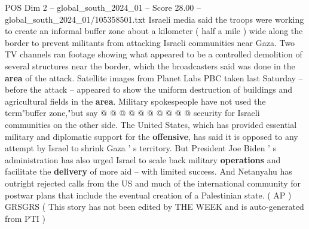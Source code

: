 \begin{textsample}{POS Dim 2 – global\_south\_2024\_01 – Score 28.00 – global\_south\_2024\_01/105358501.txt}
Israeli media said the troops were working to create an informal buffer zone about a kilometer ( half a mile ) wide along the border to prevent militants from attacking Israeli communities near Gaza.
Two TV channels ran footage showing what appeared to be a controlled demolition of several structures near the border, which the broadcasters said was done in the \textbf{area} of the attack.
Satellite images from Planet Labs PBC taken last Saturday -- before the attack -- appeared to show the uniform destruction of buildings and agricultural fields in the \textbf{area}.
Military spokespeople have not used the term"buffer zone,"but say @ @ @ @ @ @ @ @ @ @ security for Israeli communities on the other side.
The United States, which has provided essential military and diplomatic support for the \textbf{offensive}, has said it is opposed to any attempt by Israel to shrink Gaza ' s territory.
But President Joe Biden ' s administration has also urged Israel to scale back military \textbf{operations} and facilitate the \textbf{delivery} of more aid -- with limited success.
And Netanyahu has outright rejected calls from the US and much of the international community for postwar plans that include the eventual creation of a Palestinian state. ( AP ) GRSGRS ( This story has not been edited by THE WEEK and is auto-generated from PTI )

\end{textsample}
